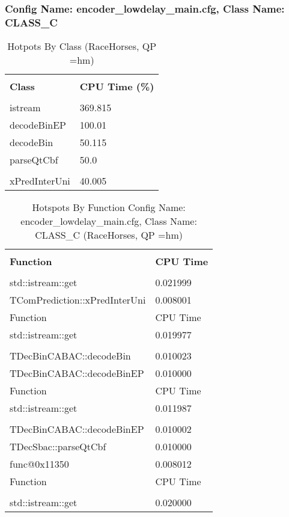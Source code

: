 \documentclass{article}%
\begin{document}
\subsubsection{Config Name: encoder\_lowdelay\_main.cfg, Class Name: CLASS\_C}%
\label{ssubsec:ConfigNameencoderlowdelaymain.cfg,ClassNameCLASSC}%
\begin{longtabu}{| X[l] | X[l] |}%
\caption{%
Hotpots By Class (RaceHorses, QP =hm)%
}%
\hline%
&\\%
\textbf{Class}&\textbf{CPU Time (\%)}\\%
&\\%
\hline%
\endhead%
istream&369.815\\%
\hline%
decodeBinEP&100.01\\%
\hline%
decodeBin&50.115\\%
\hline%
parseQtCbf&50.0\\%
\hline%
&\\%
\hline%
xPredInterUni&40.005\\%
\hline%
\end{longtabu}%
\newpage%
\begin{longtabu}{| X[l] | X[l] |}%
\caption{%
Hotspots By Function\newline%
 Config Name: encoder\_lowdelay\_main.cfg,\newline%
 Class Name: CLASS\_C\newline%
 (RaceHorses, QP =hm)%
}%
\hline%
&\\%
\textbf{Function}&\textbf{CPU Time}\\%
&\\%
\hline%
\endhead%
std::istream::get&0.021999\\%
\hline%
TComPrediction::xPredInterUni&0.008001\\%
\hline%
Function&CPU Time\\%
\hline%
std::istream::get&0.019977\\%
\hline%
&\\%
\hline%
TDecBinCABAC::decodeBin&0.010023\\%
\hline%
TDecBinCABAC::decodeBinEP&0.010000\\%
\hline%
Function&CPU Time\\%
\hline%
std::istream::get&0.011987\\%
\hline%
&\\%
\hline%
TDecBinCABAC::decodeBinEP&0.010002\\%
\hline%
TDecSbac::parseQtCbf&0.010000\\%
\hline%
func@0x11350&0.008012\\%
\hline%
Function&CPU Time\\%
\hline%
&\\%
\hline%
std::istream::get&0.020000\\%
\hline%
\end{longtabu}%
\end{document}
